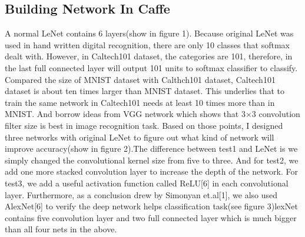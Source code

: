 \documentclass{article}
\begin{document}
\subsection{Building Network In Caffe}
A normal LeNet contains 6 layers(show in figure 1). Because original LeNet was used in hand written digital recognition, there are only 10 classes that softmax dealt with. However, in Caltech101 dataset, the categories are 101, therefore, in the last full connected layer will output 101 units to softmax classifier to classify. Compared the size of MNIST dataset with Calthch101 dataset, Caltech101 dataset is about ten times larger than MNIST dataset. This underlies that to train the same network in Caltech101 needs at least 10 times more than in MNIST. And borrow ideas from VGG network which shows that 3$\times$3 convolution filter size is best in image recognition task. Based on those points, I designed three networks with original LeNet to figure out what kind of network will improve accuracy(show in figure 2).The difference between test1 and LeNet is we simply changed the convolutional kernel size from five to three. And for test2, we add one more stacked convolution layer to increase the depth of the network. For test3, we add a useful activation function called ReLU[6] in each convolutional layer. Furthermore, as a conclusion drew by Simonyan et.al[1], we also used AlexNet[6] to verify the deep network helps classification task(see figure 3)lexNet contains five convolution layer and two full connected layer which is much bigger than all four nets in the above.
\end{document}
